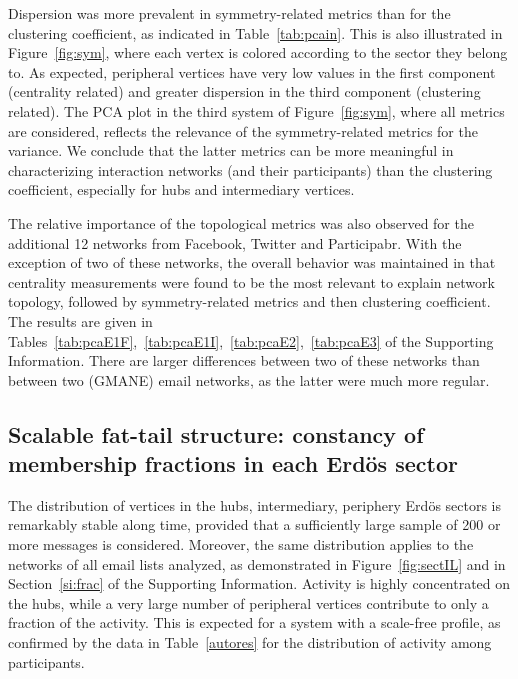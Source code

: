 \documentclass[%
	aip,
	jmp,%
	amsmath,amssymb,
	reprint,%
]{revtex4-1}
\begin{document}
Dispersion was more prevalent in symmetry-related metrics than for the clustering coefficient, as indicated in Table~\ref{tab:pcain}. This is also illustrated in Figure~\ref{fig:sym}, where each vertex is colored according to the sector they belong to. As expected, peripheral vertices have very low values in the first component (centrality related) and greater dispersion in the third component (clustering related).
The PCA plot in the third system of Figure~\ref{fig:sym}, where all metrics are considered, reflects the relevance of the symmetry-related metrics for the variance.
We conclude that the latter metrics can be more meaningful in characterizing interaction networks (and their participants) than the clustering coefficient, especially for hubs and intermediary vertices.

The relative importance of the topological metrics was also observed for the additional 12 networks from Facebook, Twitter and Participabr. With the exception of two of these networks, the overall behavior was maintained in that centrality measurements were found to be the most relevant to explain network topology, followed by symmetry-related metrics and then clustering coefficient. The results are given in Tables~\ref{tab:pcaE1F},~\ref{tab:pcaE1I},~\ref{tab:pcaE2},~\ref{tab:pcaE3} of the Supporting Information. There are larger differences between two of these networks than between two (GMANE) email networks, as the latter were much more regular.

\subsection{Scalable fat-tail structure: constancy of membership fractions in each Erd\"os sector}\label{subsec:pih}

The distribution of vertices in the hubs, intermediary, periphery Erd\"os sectors is remarkably stable along time, provided that a sufficiently large sample of 200 or more messages is considered. 
Moreover, the same distribution applies to the networks of all email lists analyzed, as demonstrated in Figure~\ref{fig:sectIL} and in Section~\ref{si:frac} of the Supporting Information. 
Activity is highly concentrated on the hubs, while a very large number of peripheral vertices contribute to only a fraction of the activity. This is expected for a system with a scale-free profile, as confirmed by the data in Table~\ref{autores} for the distribution of activity among participants.
\end{document}
